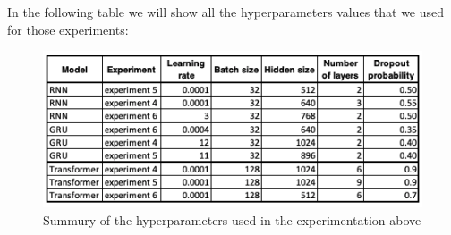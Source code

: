 In the following table we will show all the hyperparameters values that we used for those experiments:

\begin{figure}[H]
	\centering
	\includegraphics[scale=0.6]{Q4-3_Hyperparameters.png}
	\caption{Summury of the hyperparameters used in the experimentation above}
	\label{fig:fig19b}
\end{figure}


